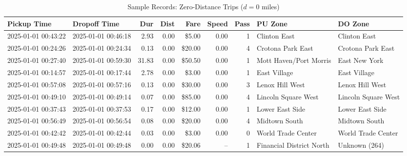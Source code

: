 \documentclass[11pt,a4paper]{article}
\begin{document}
\begin{table}[htbp]
\centering
\caption{Sample Records: Zero-Distance Trips ($d = 0$ miles)}
\label{tab:sample_zerodist}
\tiny
\begin{tabularx}{\textwidth}{l l r r r r r X X}
\toprule
\textbf{Pickup Time} & \textbf{Dropoff Time} & \textbf{Dur} & \textbf{Dist} & \textbf{Fare} & \textbf{Speed} & \textbf{Pass} & \textbf{PU Zone} & \textbf{DO Zone} \\
\midrule
2025-01-01 00:43:22 & 2025-01-01 00:46:18 & 2.93 & 0.00 & \$5.00 & 0.00 & 1 & Clinton East & Clinton East \\
2025-01-01 00:24:26 & 2025-01-01 00:24:34 & 0.13 & 0.00 & \$20.00 & 0.00 & 4 & Crotona Park East & Crotona Park East \\
2025-01-01 00:27:40 & 2025-01-01 00:59:30 & 31.83 & 0.00 & \$50.50 & 0.00 & 1 & Mott Haven/Port Morris & East New York \\
2025-01-01 00:14:57 & 2025-01-01 00:17:44 & 2.78 & 0.00 & \$3.00 & 0.00 & 1 & East Village & East Village \\
2025-01-01 00:57:08 & 2025-01-01 00:57:16 & 0.13 & 0.00 & \$30.00 & 0.00 & 3 & Lenox Hill West & Lenox Hill West \\
2025-01-01 00:49:10 & 2025-01-01 00:49:14 & 0.07 & 0.00 & \$85.00 & 0.00 & 4 & Lincoln Square West & Lincoln Square West \\
2025-01-01 00:37:43 & 2025-01-01 00:37:53 & 0.17 & 0.00 & \$12.00 & 0.00 & 1 & Lower East Side & Lower East Side \\
2025-01-01 00:56:49 & 2025-01-01 00:56:54 & 0.08 & 0.00 & \$20.00 & 0.00 & 4 & Midtown South & Midtown South \\
2025-01-01 00:42:42 & 2025-01-01 00:42:44 & 0.03 & 0.00 & \$3.00 & 0.00 & 0 & World Trade Center & World Trade Center \\
2025-01-01 00:49:48 & 2025-01-01 00:49:48 & 0.00 & 0.00 & \$20.06 & -- & 1 & Financial District North & Unknown (264) \\
\bottomrule
\end{tabularx}
\end{table}
\end{document}
